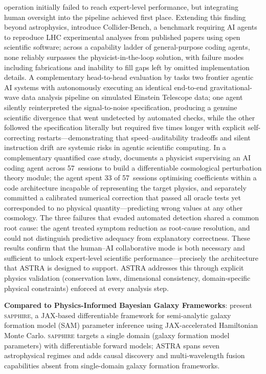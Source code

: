 \documentclass[usenatbib]{rasti}
\begin{document}
operation initially failed to reach expert-level performance, but integrating human oversight into the pipeline achieved first place. Extending this finding beyond astrophysics, \citet{faroughy2026colliderbench} introduce Collider-Bench, a benchmark requiring AI agents to reproduce LHC experimental analyses from published papers using open scientific software; across a capability ladder of general-purpose coding agents, none reliably surpasses the physicist-in-the-loop solution, with failure modes including fabrications and inability to fill gaps left by omitted implementation details. A complementary head-to-head evaluation by \citet{inguglia2026etagents} tasks two frontier agentic AI systems with autonomously executing an identical end-to-end gravitational-wave data analysis pipeline on simulated Einstein Telescope data; one agent silently reinterpreted the signal-to-noise specification, producing a genuine scientific divergence that went undetected by automated checks, while the other followed the specification literally but required five times longer with explicit self-correcting restarts---demonstrating that speed--auditability tradeoffs and silent instruction drift are systemic risks in agentic scientific computing. In a complementary quantified case study, \citet{nguyen2026physicsallyouneed} documents a physicist supervising an AI coding agent across 57~sessions to build a differentiable cosmological perturbation theory module; the agent spent 33 of 57~sessions optimising coefficients within a code architecture incapable of representing the target physics, and separately committed a calibrated numerical correction that passed all oracle tests yet corresponded to no physical quantity---predicting wrong values at any other cosmology. The three failures that evaded automated detection shared a common root cause: the agent treated symptom reduction as root-cause resolution, and could not distinguish predictive adequacy from explanatory correctness. These results confirm that the human--AI collaborative mode is both necessary and sufficient to unlock expert-level scientific performance---precisely the architecture that ASTRA is designed to support. ASTRA addresses this through explicit physics validation (conservation laws, dimensional consistency, domain-specific physical constraints) enforced at every analysis step.

\textbf{Compared to Physics-Informed Bayesian Galaxy Frameworks}: \citet{pandya2026sapphire} present \textsc{sapphire}, a JAX-based differentiable framework for semi-analytic galaxy formation model (SAM) parameter inference using JAX-accelerated Hamiltonian Monte Carlo. \textsc{sapphire} targets a single domain (galaxy formation model parameters) with differentiable forward models; ASTRA spans seven astrophysical regimes and adds causal discovery and multi-wavelength fusion capabilities absent from single-domain galaxy formation frameworks.
\end{document}
